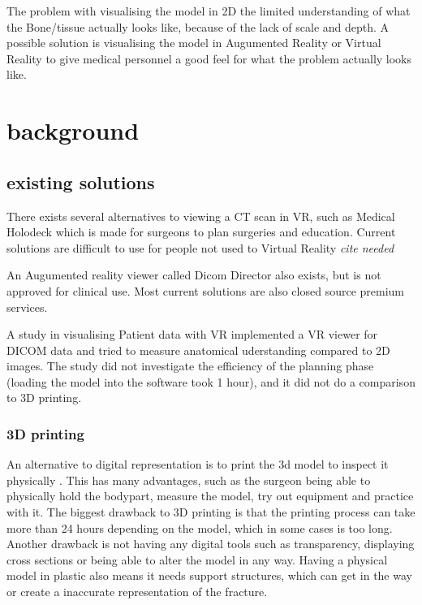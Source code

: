 \documentclass[11pt]{scrartcl}
\begin{document}
The problem with visualising the model in 2D the limited understanding of what
the Bone/tissue actually looks like, because of the lack of scale and depth. A
possible solution is visualising the model in Augumented Reality or Virtual
Reality to give medical personnel a good feel for what the problem actually looks like. 

\section{ background } 

\subsection{ existing solutions}

There exists several alternatives to viewing a CT scan in VR, such as Medical Holodeck \cite{holodeck} which is made for surgeons to plan surgeries and education. Current solutions are difficult to use for people not used to Virtual Reality \emph{cite needed}

An Augumented reality viewer called Dicom Director also exists, but is not approved for clinical use. \cite{dicomdirector} Most current solutions are also closed source premium services.

A study in visualising Patient data with VR \cite{vertemati_virtual_2019} implemented a VR viewer for DICOM data and tried to measure anatomical uderstanding compared to 2D images. The study did not investigate the efficiency of the planning phase (loading the model into the software took 1 hour), and it did not do a comparison to 3D printing.

\subsubsection { 3D printing }

An alternative to digital representation is to print the 3d model to inspect it physically \cite{virtualplanningand3dprinting}. This has many advantages, such as the surgeon being able to physically hold the bodypart, measure the model, try out equipment and practice with it.
The biggest drawback to 3D printing is that the printing process can take more than 24 hours depending on the model, which in some cases is too long. Another drawback is not having any digital tools such as transparency, displaying cross sections or being able to alter the model in any way. Having a physical model in plastic also means it needs support structures, which can get in the way or create a inaccurate representation of the fracture.
\end{document}
